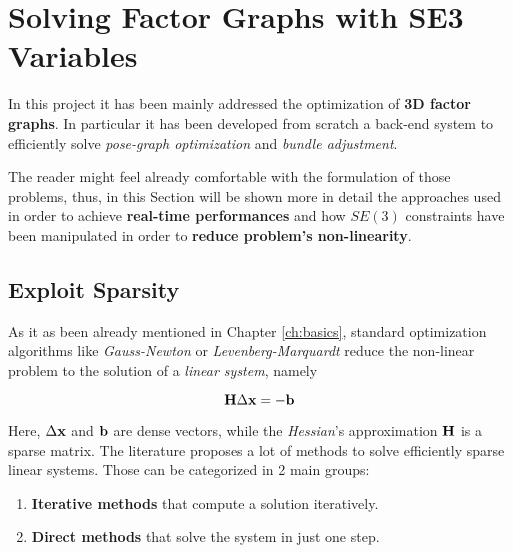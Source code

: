 \chapter{Solving Factor Graphs with SE3 Variables}\label{ch:solvingSE3}

In this project it has been mainly addressed the optimization of \textbf{3D factor graphs}. In particular it has been developed from scratch a back-end system to efficiently solve \textit{pose-graph optimization} and \textit{bundle adjustment}.

The reader might feel already comfortable with the formulation of those problems, thus, in this Section will be shown more in detail the approaches used in order to achieve \textbf{real-time performances} and how $SE(3)$ constraints have been manipulated in order to \textbf{reduce problem's non-linearity}. 

\section{Exploit Sparsity}\label{sec:sparsity}
As it as been already mentioned in Chapter \ref{ch:basics}, standard optimization algorithms like \textit{Gauss-Newton} or \textit{Levenberg-Marquardt} reduce the non-linear problem to the solution of a \textit{linear system}, namely

\begin{equation*}
    \mathbf{H} \Delta \mathbf{x} = -\mathbf{b}
\end{equation*}

\noindent Here, $\Delta \mathbf{x}$ and $\mathbf{b}$ are dense vectors, while the \textit{Hessian}'s approximation $\mathbf{H}$ is a sparse matrix. The literature proposes a lot of methods to solve efficiently sparse linear systems. Those can be categorized in 2 main groups:

\begin{enumerate}
    \item \textbf{Iterative methods} \cite{saad2003iterativeSPsolvers} that compute a solution iteratively.
    \item \textbf{Direct methods} \cite{davis2006directSPsolvers} that solve the system in just one step.
\end{enumerate}

